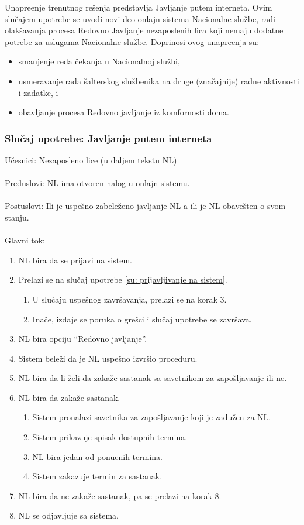 Unapre\dj enje trenutnog re\v senja predstavlja Javljanje putem interneta. Ovim slu\v cajem upotrebe se uvodi novi deo onlajn sistema Nacionalne slu\v zbe, radi olak\v savanja procesa Redovno Javljanje nezaposlenih lica koji nemaju dodatne potrebe za uslugama Nacionalne slu\v zbe. Doprinosi ovog unapre\dj enja su:
\begin{itemize}
	\item smanjenje reda \v cekanja u Nacionalnoj slu\v zbi,
	\item usmeravanje rada \v salterskog slu\v zbenika na druge (zna\v cajnije) radne aktivnosti i zadatke, i
	\item obavljanje procesa Redovno javljanje iz komfornosti doma.
\end{itemize}

\subsubsection{Slu\v caj upotrebe: Javljanje putem interneta}
\label{su: javljanje putem interneta}

\noindent U\v cesnici: Nezaposleno lice (u daljem tekstu NL)
\\
\\ Preduslovi: NL ima otvoren nalog u onlajn sistemu.
\\
\\ Postuslovi: Ili je uspe\v sno zabele\v zeno javljanje NL-a ili je NL obave\v sten o svom stanju.
\\ 
\\ Glavni tok:
\begin{enumerate}
	\item NL bira da se prijavi na sistem.
	\item Prelazi se na slu\v caj upotrebe \ref{su: prijavljivanje na sistem}.
	\begin{enumerate}
		\item U slu\v caju uspe\v snog zavr\v savanja, prelazi se na korak 3.
		\item Ina\v ce, izdaje se poruka o gre\v sci i slu\v caj upotrebe se zavr\v sava.
	\end{enumerate}
	\item NL bira opciju ``Redovno javljanje''.
	\item Sistem bele\v zi da je NL uspe\v sno izvr\v sio proceduru.
	\item NL bira da li \v zeli da zaka\v ze sastanak sa savetnikom za zapo\v sljavanje ili ne.
	\item NL bira da zaka\v ze sastanak.
	\begin{enumerate}
		\item Sistem pronalazi savetnika za zapo\v sljavanje koji je zadu\v zen za NL.
		\item Sistem prikazuje spisak dostupnih termina.
		\item NL bira jedan od ponu\dj enih termina.
		\item Sistem zakazuje termin za sastanak.
	\end{enumerate}
	\item NL bira da ne zaka\v ze sastanak, pa se prelazi na korak 8.
	\item NL se odjavljuje sa sistema.
\end{enumerate}

